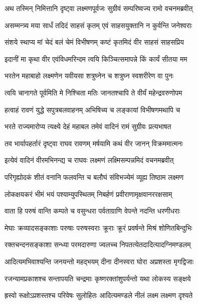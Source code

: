 
\twolineshloka
{अथ तस्मिन् निमित्तानि दृष्ट्वा लक्ष्मणपूर्वजः}
{सुग्रीवं सम्परिष्वज्य रामो वचनमब्रवीत्} %

\twolineshloka
{असम्मन्त्र्य मया सार्धं तदिदं साहसं कृतम्}
{एवं साहसयुक्तानि न कुर्वन्ति जनेश्वराः} %

\twolineshloka
{संशये स्थाप्य मां चेदं बलं चेमं विभीषणम्}
{कष्टं कृतमिदं वीर साहसं साहसप्रिय} %

\twolineshloka
{इदानीं मा कृथा वीर एवंविधमरिन्दम}
{त्वयि किञ्चित्समापन्ने किं कार्यं सीतया मम} %

\twolineshloka
{भरतेन महाबाहो लक्ष्मणेन यवीयसा}
{शत्रुघ्नेन च शत्रुघ्न स्वशरीरेण वा पुनः} %

\twolineshloka
{त्वयि चानागते पूर्वमिति मे निश्चिता मतिः}
{जानतश्चापि ते वीर्यं महेन्द्रवरुणोपम} %

\twolineshloka
{हत्वाहं रावणं युद्धे सपुत्रबलवाहनम्}
{अभिषिच्य च लङ्कायां विभीषणमथापि च} %

\twolineshloka
{भरते राज्यमारोप्य त्यक्ष्ये देहं महाबल}
{तमेवं वादिनं रामं सुग्रीवः प्रत्यभाषत} %

\twolineshloka
{तव भार्यापहर्तारं दृष्ट्वा राघव रावणम्}
{मर्षयामि कथं वीर जानन् विक्रममात्मनः} %

\twolineshloka
{इत्येवं वादिनं वीरमभिनन्द्य च राघवः}
{लक्ष्मणं लक्ष्मिसम्पन्नमिदं वचनमब्रवीत्} %

\twolineshloka
{परिगृह्योदकं शीतं वनानि फलवन्ति च}
{बलौघं संविभज्येमं व्यूह्य तिष्ठाम लक्ष्मण} %

\twolineshloka
{लोकक्षयकरं भीमं भयं पश्याम्युपस्थितम्}
{निबर्हणं प्रवीराणामृक्षवानररक्षसाम्} %

\twolineshloka
{वाता हि परुषं वान्ति कम्पते च वसुन्धरा}
{पर्वताग्राणि वेपन्ते नदन्ति धरणीधराः} %

\twolineshloka
{मेघाः क्रव्यादसङ्काशाः परुषाः परुषस्वराः}
{क्रूराः क्रूरं प्रवर्षन्ते मिश्रं शोणितबिन्दुभिः} %

\twolineshloka
{रक्तचन्दनसङ्काशा सन्ध्या परमदारुणा}
{ज्वलच्च निपतत्येतदादित्यादग्निमण्डलम्} %

\twolineshloka
{आदित्यमभिवाश्यन्ति जनयन्तो महद्भयम्}
{दीना दीनस्वरा घोरा अप्रशस्ता मृगद्विजाः} %

\twolineshloka
{रजन्यामप्रकाशश्च सन्तापयति चन्द्रमाः}
{कृष्णरक्तांशुपर्यन्तो यथा लोकस्य सङ्क्षये} %

\twolineshloka
{ह्रस्वो रूक्षोऽप्रशस्तश्च परिवेषः सुलोहितः}
{आदित्यमण्डले नीलं लक्ष्म लक्ष्मण दृश्यते} %

